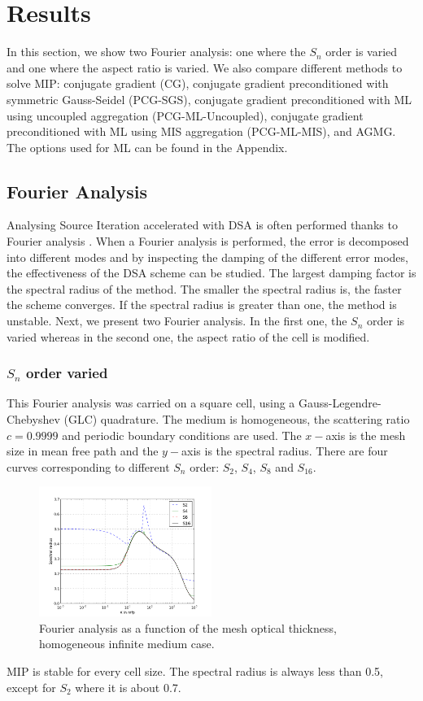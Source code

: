 \section{Results} \label{sec_res}
In this section, we show two Fourier analysis: one where the $S_n$ order is
varied and one where the aspect ratio is varied. We also compare different
methods to solve MIP: conjugate gradient (CG), conjugate gradient
preconditioned with symmetric Gauss-Seidel (PCG-SGS), conjugate gradient
preconditioned with ML using uncoupled aggregation (PCG-ML-Uncoupled),
conjugate gradient preconditioned with ML using MIS aggregation (PCG-ML-MIS),
and AGMG. The options used for ML can be found in the Appendix.
\subsection{Fourier Analysis}
Analysing Source Iteration accelerated with DSA is often performed thanks to
Fourier analysis \cite{larsen_dsa,consistent_p1}. When a Fourier analysis is
performed, the error is decomposed into different modes and by inspecting the 
damping of the different error modes, the effectiveness of the DSA scheme can 
be studied. The largest damping factor is the spectral radius of the method. 
The smaller
the spectral radius is, the faster the scheme converges. If the spectral
radius is greater than one, the method is unstable. Next, we present two Fourier 
analysis. In the first one, the $S_n$ order is varied whereas in the second one, 
the aspect ratio of the cell is modified.
\subsubsection{$S_n$ order varied}
This Fourier analysis was carried on a square cell, using a
Gauss-Legendre-Chebyshev (GLC) quadrature. The medium is homogeneous, the scattering
ratio $c=0.9999$ and periodic boundary conditions are used. The $x-$axis is the mesh
size in mean free path and the $y-$axis is the spectral radius. There are four
curves corresponding to different $S_n$ order: $S_2$, $S_4$, $S_8$ and
$S_{16}$.
\begin{figure}[H]
\centering
\includegraphics[width=0.5\textwidth]{sn_order_9999}
\caption{Fourier analysis as a function of the mesh optical thickness,
homogeneous infinite medium case.}
\end{figure}
MIP is stable for every cell size. The spectral radius is always less than
0.5, except for $S_2$ where it is about 0.7.

